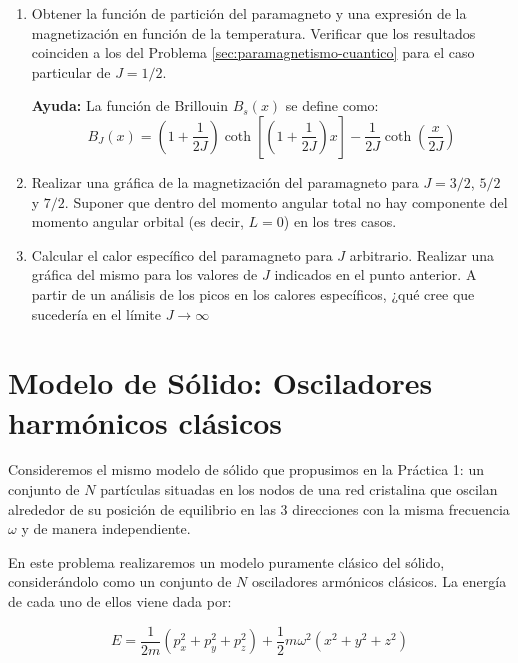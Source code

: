 \documentclass[a4paper,11pt]{article}
\begin{document}
\begin{enumerate}[label=(\alph*),
                  leftmargin=2\parindent,
                  rightmargin=2\parindent]

    \item{Obtener la función de partición del paramagneto y una 
          expresión de la magnetización en función de la temperatura. 
          Verificar que los resultados coinciden a los del Problema 
          \ref{sec:paramagnetismo-cuantico} para el caso particular de 
          $J=1/2$.}
    
    {\small
    \textbf{Ayuda:} La función de Brillouin $B_s(x)$ se define como:
    $$ B_J(x)  = \left( 1 + \frac{1}{2J} \right)
    \coth \left[ \left( 1 + \frac{1}{2J} \right)x \right] -
    \frac{1}{2J} \coth \left( \frac{x}{2J} \right) $$
    }

    \item{Realizar una gráfica de la magnetización del paramagneto 
          para $J = 3/2$, $5/2$ y $7/2$. Suponer que dentro del momento 
          angular total no hay componente del momento angular orbital 
          (es decir, $L=0$) en los tres casos.}
    
    \item{Calcular el calor específico del paramagneto para $J$ 
          arbitrario. Realizar una gráfica del mismo para los valores de $J$ 
          indicados en el punto anterior.
          A partir de un análisis de los picos en los calores 
          específicos, ¿qué cree que sucedería en el límite
          $J \rightarrow \infty$}

\end{enumerate}



\section{Modelo de Sólido: Osciladores harmónicos clásicos}

Consideremos el mismo modelo de sólido que propusimos en la Práctica 1:
un conjunto de $N$ partículas situadas en los nodos de una red 
cristalina que oscilan alrededor de su posición de equilibrio en las 3 
direcciones con la misma frecuencia $\omega$ y de manera independiente.

En este problema realizaremos un modelo puramente clásico del sólido, 
considerándolo como un conjunto de $N$ osciladores armónicos clásicos.
La energía de cada uno de ellos viene dada por:

$$ E = \frac{1}{2m}(p_x^2 + p_y^2 + p_z^2) +
       \frac{1}{2} m \omega^2 (x^2 + y^2 + z^2) $$
\end{document}
